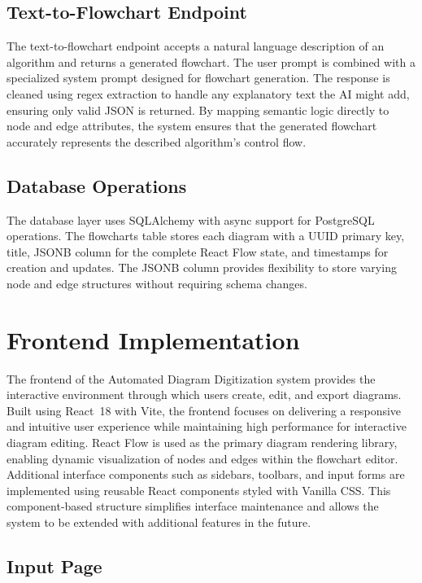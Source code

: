 \subsection{Text-to-Flowchart Endpoint}

The text-to-flowchart endpoint accepts a natural language description of an algorithm and returns a generated flowchart. The user prompt is combined with a specialized system prompt designed for flowchart generation. The response is cleaned using regex extraction to handle any explanatory text the AI might add, ensuring only valid JSON is returned. By mapping semantic logic directly to node and edge attributes, the system ensures that the generated flowchart accurately represents the described algorithm's control flow.

\subsection{Database Operations}

The database layer uses SQLAlchemy with async support for PostgreSQL operations. The flowcharts table stores each diagram with a UUID primary key, title, JSONB column for the complete React Flow state, and timestamps for creation and updates. The JSONB column provides flexibility to store varying node and edge structures without requiring schema changes.

\section{Frontend Implementation}
\label{sec:frontend}

The frontend of the Automated Diagram Digitization system provides the interactive environment through which users create, edit, and export diagrams. Built using React~18 with Vite, the frontend focuses on delivering a responsive and intuitive user experience while maintaining high performance for interactive diagram editing. React Flow is used as the primary diagram rendering library, enabling dynamic visualization of nodes and edges within the flowchart editor. Additional interface components such as sidebars, toolbars, and input forms are implemented using reusable React components styled with Vanilla CSS. This component-based structure simplifies interface maintenance and allows the system to be extended with additional features in the future.

\subsection{Input Page}

